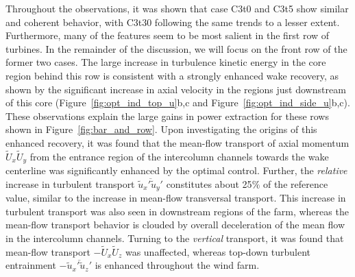 	 Throughout the observations, it was shown that case C3t0 and C3t5 show similar and coherent behavior, with C3t30 following the same trends to a lesser extent. Furthermore, many of the features seem to be most salient in the first row of turbines. In the remainder of the discussion, we will focus on the front row of the former two cases. The large increase in turbulence kinetic energy in the core region behind this row is consistent with a strongly enhanced wake recovery, as shown by the significant increase in axial velocity in the regions just downstream of this core (Figure~\ref{fig:opt_ind_top_u}b,c and Figure~\ref{fig:opt_ind_side_u}b,c). These observations explain the large gains in power extraction for these rows shown in Figure~\ref{fig:bar_and_row}. Upon investigating the origins of this enhanced recovery, it was found that the mean-flow transport of axial momentum $\widetilde{U}_x \widetilde{U}_y$ from the entrance region of the intercolumn channels towards the wake centerline was significantly enhanced by the optimal control. Further, the \emph{relative} increase in turbulent transport $\overline{\widetilde{u}_x' \widetilde{u}_y'}$ constitutes about 25$\%$ of the reference value, similar to the increase in mean-flow transversal transport. This increase in turbulent transport was also seen in downstream regions of the farm, whereas the mean-flow transport behavior is clouded by overall deceleration of the mean flow in the intercolumn channels. Turning to the \emph{vertical} transport, it was found that mean-flow transport $-\widetilde{U}_x \widetilde{U}_z$ was unaffected, whereas top-down turbulent entrainment $- \overline{\widetilde{u}_x' \widetilde{u}_z'}$ is enhanced throughout the wind farm. 

